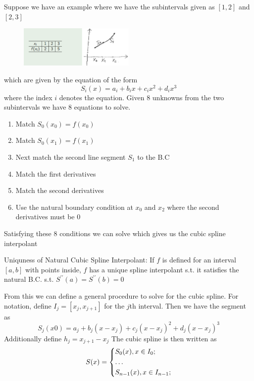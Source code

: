\begin{eg}
Suppose we have an example where we have the subintervals given as \(\left[ 1,2 \right] \)  and 
\(\left[ 2,3 \right] \)  
\begin{figure}[H]
    \centering
    \includegraphics[width=0.5\textwidth]{Figures/05.png}
    \caption{}
    \label{fig:}
\end{figure}
which are given by the equation of the form
\[
    S_i (x) = a_i + b_i x + c_i x^{2}  + d_i x^{3} 
\]
where the index \(i\) denotes the equation. Given 8 unknowns from the two subintervals we have 8 equations to solve. 
\begin{enumerate}
    \item Match \(S_0 (x_0) = f(x_0) \) 
    \item Match \(S_0 (x_1) = f(x_1)\) 
    \item Next match the second line segment \(S_1\) to the B.C
    \item Match the first derivatives 
    \item Match the second derivatives
    \item Use the natural boundary condition at \(x_0\) and \(x_2\) where the second derivatives must be 0
\end{enumerate}
Satisfying these 8 conditions we can solve which gives us the cubic spline interpolant
\end{eg}
\begin{theorem}
    Uniquness of Natural Cubic Spline Interpolant: If \(f\) is defined for an interval 
    \(\left[ a,b \right] \) with points inside, \(f\) has a unique spline interpolant s.t. it satisfies the 
    natural B.C. s.t. \(S^{\prime\prime} (a) = S^{\prime\prime} (b) = 0\) 
\end{theorem}
From this we can define a general procedure to solve for the cubic spline. For notation, define
\(I_j = \left[  x_j, x_{j+1} \right]\)  for the \(j\)th interval. Then we have the segment as 
\[
    S_j (x0) = a_j + b_j (x- x_j) + c_j (x-x_j)^{2}  + d_j (x- x_j)^{3} 
\] 
Additionally define \(h_j = x_{j+1} - x_j \) 
The cubic spline is then written as 
\[
    S(x) = \begin{dcases}
        S_0(x), x \in I_0  ;\\
        \dots  \\
        S_{n-1}(x) ,x \in I_{n-1}   ;\\
    \end{dcases}
\]
